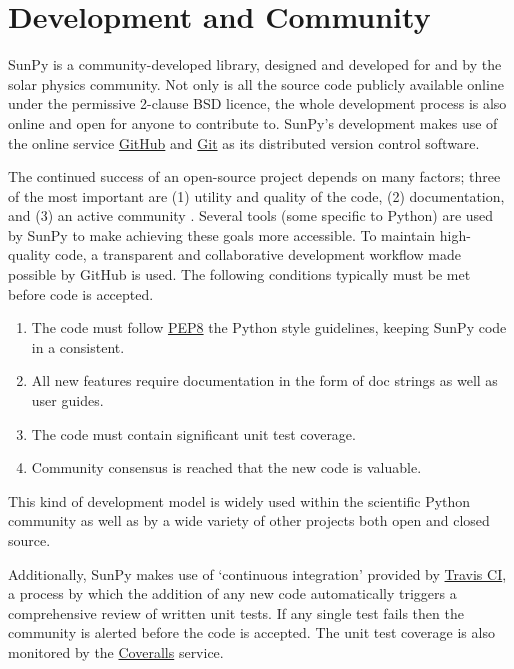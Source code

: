 \section{Development and Community}\label{sec:dev}
SunPy is a community-developed library, designed and developed for and by 
the solar physics community. Not only is all the source code publicly available 
online under the permissive 2-clause BSD licence, the whole 
development process is also online and open for anyone to contribute to.
SunPy's development makes use of the online service 
\href{http://github.com}{GitHub} and \href{http://git-scm.com/}{Git}
as its distributed version control software. 

The continued success of an open-source project depends on many factors;
three of the most important are (1) utility and quality of the code, (2) documentation, and (3) an
active community \citep{bangerth2013}. Several tools (some specific to Python) are used by
SunPy to make achieving these goals more accessible. To maintain high-quality code, a 
transparent and collaborative development workflow made possible by GitHub is used.
The following conditions typically must be met before code is accepted.
\begin{enumerate}
	\item  The code must follow 	
	\href{http://www.python.org/dev/peps/pep-0008/}{PEP8} the Python style 
	guidelines, keeping SunPy code in a consistent.
	
	\item All new features require documentation in the form of doc strings as well as user
	guides. 
	
	\item The code must contain significant unit test coverage.

        \item Community consensus is reached that the new code is valuable.
\end{enumerate}
This kind of development model is widely used within the scientific Python 
community as well as by a wide variety of other projects both open and closed 
source.

Additionally, SunPy makes use of `continuous integration' provided by
\href{http://travis-ci.org}{Travis CI}, a process by which the addition of any new code 
automatically triggers a comprehensive review of written unit tests. If any single test
fails then the community is alerted before the code is accepted. The unit test coverage is
also monitored by the \href{http://coveralls.io}{Coveralls} service.

